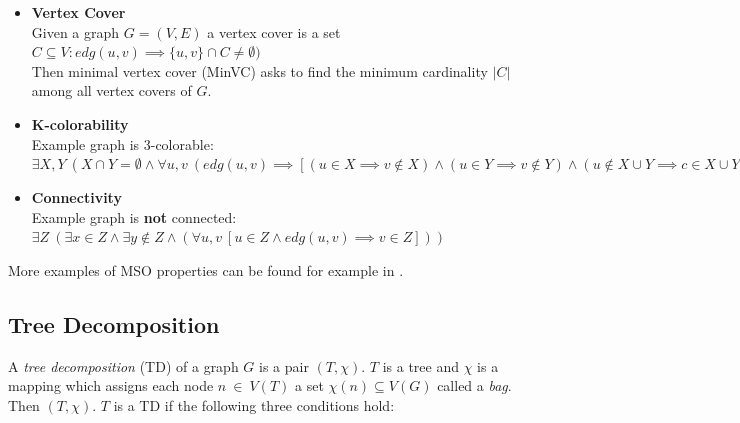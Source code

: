 \documentclass[a4paper, 12pt, bibliography=totoc]{scrartcl}
\begin{document}
\begin{itemize}
		\item \textbf{Vertex Cover} \cite[Ch. 4.2]{dpdbpadl2020}\\
	Given a graph $G=(V,E)$ a vertex cover is a set\\
	$C \subseteq V:edg(u,v)\implies \{u,v\}\cap C \neq \emptyset)$\\
	Then minimal vertex cover (MinVC) asks to find the minimum cardinality $|C|$ among all vertex covers of $G$. 
	
	\item \textbf{K-colorability}\\
	Example graph is 3-colorable:\\	
	$\exists X,Y~(X \cap Y = \emptyset \land \forall u,v~(edg(u,v) \implies [(u\in X \implies v\notin X)\land (u\in Y \implies v\notin Y)\land (u\notin X \cup Y \implies c \in X \cup Y)]))$
	
	\item \textbf{Connectivity}\\
	Example graph is \textbf{not} connected:\\	
	$\exists Z~(\exists x \in Z \land \exists y \notin Z \land (\forall u,v~[u\in Z \land edg(u,v) \implies v \in Z]))$

\end{itemize}
More examples of MSO properties can be found for example in \cite[Theorem 3.5]{ARNBORG1991308}.


\subsection{Tree Decomposition}
A \textit{tree decomposition} (TD) of a graph $G$ is a pair $(T, \chi)$. $T$ is a tree and $\chi$ is a mapping which assigns each node $n~\in~V(T)$ 
a set $\chi(n) \subseteq V(G)$ called a \textit{bag}. Then $(T, \chi)$. $T$ is a TD if the following three conditions hold:
\end{document}
